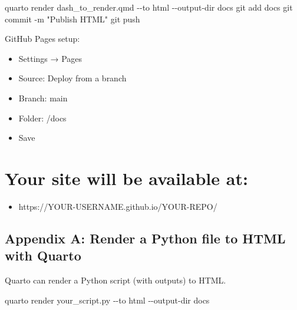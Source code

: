 \documentclass[
  letterpaper,
  DIV=11,
  numbers=noendperiod]{scrreprt}
\newenvironment{Shaded}{\begin{snugshade}}{\end{snugshade}}
\newcommand{\NormalTok}[1]{\textcolor[rgb]{0.00,0.23,0.31}{#1}}
\providecommand{\tightlist}{%
  \setlength{\itemsep}{0pt}\setlength{\parskip}{0pt}}\usepackage{longtable,booktabs,array}
\begin{document}
\begin{Shaded}
\begin{Highlighting}[]
\NormalTok{quarto render dash\_to\_render.qmd {-}{-}to html {-}{-}output{-}dir docs }
\NormalTok{git add docs }
\NormalTok{git commit {-}m "Publish HTML" }
\NormalTok{git push }
\end{Highlighting}
\end{Shaded}

GitHub Pages setup:

\begin{itemize}
\tightlist
\item
  Settings → Pages
\item
  Source: Deploy from a branch
\item
  Branch: main
\item
  Folder: /docs
\item
  Save
\end{itemize}


\chapter{Your site will be available
at:}\label{your-site-will-be-available-at}

\begin{itemize}
\tightlist
\item
  https://YOUR-USERNAME.github.io/YOUR-REPO/
\end{itemize}

\section{Appendix A: Render a Python file to HTML with
Quarto}\label{appendix-a-render-a-python-file-to-html-with-quarto}

Quarto can render a Python script (with outputs) to HTML.

\begin{Shaded}
\begin{Highlighting}[]
\NormalTok{quarto render your\_script.py {-}{-}to html {-}{-}output{-}dir docs}
\end{Highlighting}
\end{Shaded}
\end{document}
